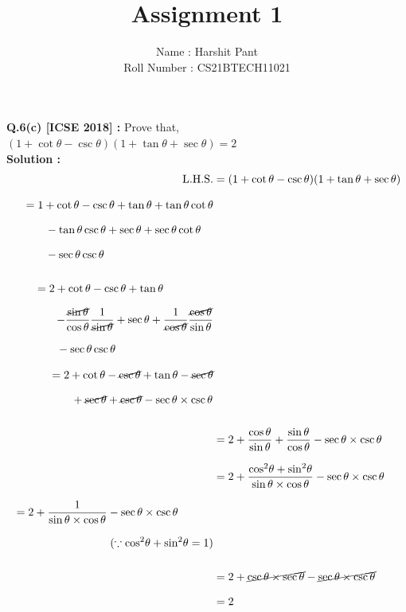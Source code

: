 \documentclass[journal,12pt,twocolumn]{IEEEtran}
\title{Assignment 1}
\author{\Large{Name : Harshit Pant}\\\Large{Roll Number : CS21BTECH11021}}
\date{}
\begin{document}
\maketitle
\setlength{\parindent}{0cm}
\textbf{Q.6(c) [ICSE 2018] :}
Prove that,\\[.1in]
$(1 +\cot\theta -\csc\theta)(1 + \tan\theta +\sec\theta)=2$\\[.1in]
\textbf{Solution : }
\begin{align}
\text{L.H.S.}&=(1+ \cot\theta -\csc\theta)(1+\tan\theta+\sec\theta)\\[.1in]
\begin{split}
&=1+\cot\theta-\csc\theta+\tan\theta+\tan\theta\cot\theta\\[.1in]
&\qquad-\tan\theta\csc\theta+\sec\theta+\sec\theta\cot\theta\\[.1in]
&\qquad-\sec\theta\csc\theta\\[.1in]
\end{split}\\[.1in]
\begin{split}
&=\displaystyle{2+\cot\theta-\csc\theta+\tan\theta}\\[.1in]
&\qquad
\displaystyle{-\frac{\cancel{\sin\theta}}{\cos\theta}\frac{1}{\cancel{\sin\theta}}+\sec\theta+\frac{1}{\cancel{\cos\theta}}\frac{\cancel{\cos\theta}}{\sin\theta}}\\[.1in]
&\qquad
-\sec\theta\csc\theta
\end{split}\\[.1in]
\begin{split}
&=2+\cot\theta-\cancel{\csc\theta}+\tan\theta-\cancel{\sec\theta}\\[.1in]
&\qquad+\cancel{\sec\theta}+\cancel{\csc\theta}-\sec\theta\times\csc\theta\\[.1in]
\end{split}\\[.1in]
&=2+\dfrac{\cos\theta}{\sin\theta}+\dfrac{\sin\theta}{\cos\theta}-\sec\theta\times\csc\theta\\[.1in]
&=\displaystyle{2+\dfrac{{\cos}^2\theta+{\sin}^2\theta}{\sin\theta\times\cos\theta}-\sec\theta\times\csc\theta}\\[.1in]
\begin{split}
&=\displaystyle{2+\frac{1}{\sin\theta\times\cos\theta}-\sec\theta\times\csc\theta}\\[.1in]
&\hspace{1.2in}
(\because{\cos}^2\theta+{\sin}^2\theta=1)\\[.1in]
\end{split}\\[.1in]
&=\displaystyle{2+\cancel{\csc\theta\times\sec\theta}-\cancel{\sec\theta\times\csc\theta}}\\[.1in]
&=2
\end{align}
\end{document}

